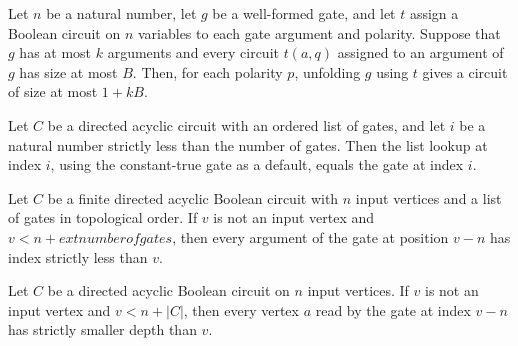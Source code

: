 \begin{theorem}
\label{BoolCircuit.unfoldGate_size_le}
\leanok
{}
Let $n$ be a natural number, let $g$ be a well-formed gate, and let $t$ assign a Boolean
circuit on $n$ variables to each gate argument and polarity. Suppose that $g$ has at
most $k$ arguments and every circuit $t(a,q)$ assigned to an argument of $g$ has size at
most $B$. Then, for each polarity $p$, unfolding $g$ using $t$ gives a circuit of size
at most $1+kB$.
\end{theorem}

\begin{theorem}
\label{BoolCircuit.DAGCircuit.getD_gates}
\leanok
{}
Let $C$ be a directed acyclic circuit with an ordered list of gates, and let $i$ be a
natural number strictly less than the number of gates. Then the list lookup at index
$i$, using the constant-true gate as a default, equals the gate at index $i$.
\end{theorem}

\begin{theorem}
\label{BoolCircuit.DAGCircuit.args_lt_vertex}
\leanok
{}
Let $C$ be a finite directed acyclic Boolean circuit with $n$ input vertices and a list
of gates in topological order. If $v$ is not an input vertex and $v<n+	ext{number of
gates}$, then every argument of the gate at position $v-n$ has index strictly less than
$v$.
\end{theorem}

\begin{theorem}
\label{BoolCircuit.DAGCircuit.depthAt_lt_of_arg}
\leanok
{}
Let $C$ be a directed acyclic Boolean circuit on $n$ input vertices. If $v$ is not an
input vertex and $v<n+|C|$, then every vertex $a$ read by the gate at index $v-n$ has
strictly smaller depth than $v$.
\end{theorem}


